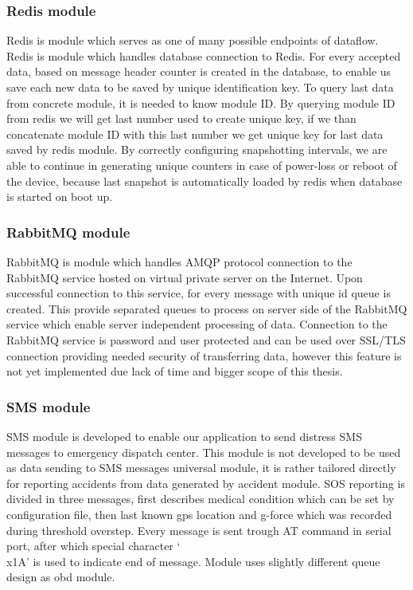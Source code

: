 \subsubsection{Redis module} %
\label{ssub:redis_module}
Redis is module which serves as one of many possible endpoints of dataflow. Redis is module which handles database connection to Redis. For every accepted data, based on message header counter is created in the database, to enable us save each new data to be saved by unique identification key. To query last data from concrete module, it is needed to know module ID. By querying module ID from redis we will get last number used to create unique key, if we than concatenate module ID with this last number we get unique key for last data saved by redis module. By correctly configuring snapshotting intervals, we are able to continue in generating unique counters in case of power-loss or reboot of the device, because last snapshot is automatically loaded by redis when database is started on boot up.
\subsubsection{RabbitMQ module} %
\label{ssub:rabbitmq_module}
RabbitMQ is module which handles AMQP protocol connection to the RabbitMQ service hosted on virtual private server on the Internet. Upon successful connection to this service, for every message with unique id queue is created. This provide separated queues to process on server side of the RabbitMQ service which enable server independent processing of data. Connection to the RabbitMQ service is password and user protected and can be used over SSL/TLS connection providing needed security of transferring data, however this feature is not yet implemented due lack of time and bigger scope of this thesis.
\subsubsection{SMS module} %
\label{ssub:sms_module}
SMS module is developed to enable our application to send distress SMS messages to emergency dispatch center. This module is not developed to be used as data sending to SMS messages universal module, it is rather tailored directly for reporting accidents from data generated by accident module. SOS reporting is divided in three messages, first describes medical condition which can be set by configuration file, then last known gps location and g-force which was recorded during threshold overstep. Every message is sent trough AT command in serial port, after which special character `\\x1A' is used to indicate end of message. Module uses slightly different queue design as \gls{obd} module.
